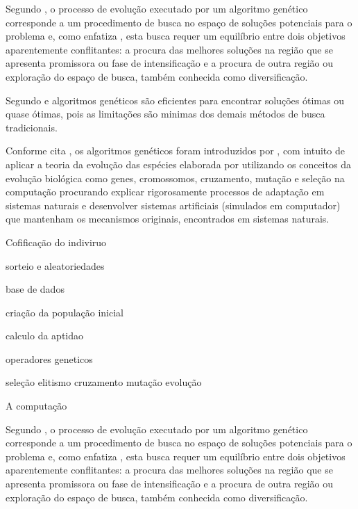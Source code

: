 \documentclass{abntpuc}
\begin{document}
Segundo \cite{oliveira2005algoritmo}, o processo de evolução executado por um algoritmo genético corresponde a um procedimento de busca no espaço de soluções potenciais para o problema e, como enfatiza \cite{michalewicz1996evolutionary}, esta busca requer um equilíbrio entre dois objetivos aparentemente conflitantes: a procura das melhores soluções na região que se apresenta promissora ou fase de intensificação e a procura de outra região ou exploração do espaço de busca, também conhecida como diversificação.\par


Segundo \cite{hamawaki2011geraccao} e \cite{oliveira2005algoritmo} algoritmos genéticos são eficientes para encontrar soluções ótimas ou quase ótimas, pois as limitações são minimas dos demais métodos de busca tradicionais.


Conforme cita \cite{oliveira2005algoritmo}, os algoritmos genéticos foram introduzidos por \cite{holland1975adaptation}, com intuito de aplicar a teoria da evolução das espécies elaborada por \cite{darwin1968origin} utilizando os conceitos da evolução biológica como genes, cromossomos, cruzamento, mutação e seleção na computação procurando explicar rigorosamente processos de adaptação em sistemas naturais e desenvolver sistemas artificiais (simulados em computador) que mantenham os mecanismos originais, encontrados em sistemas naturais.\par








Cofificação do indiviruo 

sorteio e aleatoriedades

base de dados

criação da população inicial

calculo da aptidao

operadores geneticos

seleção 
elitismo 
cruzamento
mutação
evolução



A computação 





Segundo \cite{oliveira2005algoritmo}, o processo de evolução executado por um algoritmo genético corresponde a um procedimento de busca no espaço de soluções potenciais para o problema e, como enfatiza \cite{michalewicz1996evolutionary}, esta busca requer um equilíbrio entre dois objetivos aparentemente conflitantes: a procura das melhores soluções na região que se apresenta promissora ou fase de intensificação e a procura de outra região ou exploração do espaço de busca, também conhecida como diversificação.\par
\end{document}
